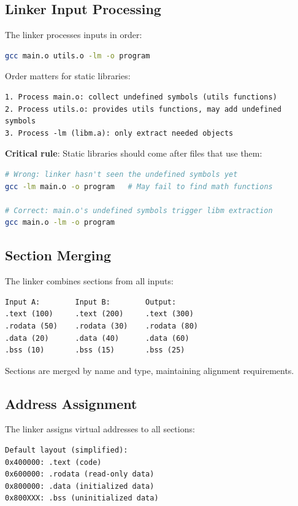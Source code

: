 \subsection{Linker Input Processing}

The linker processes inputs in order:

\begin{lstlisting}[language=bash]
gcc main.o utils.o -lm -o program
\end{lstlisting}

Order matters for static libraries:
\begin{verbatim}
1. Process main.o: collect undefined symbols (utils functions)
2. Process utils.o: provides utils functions, may add undefined symbols
3. Process -lm (libm.a): only extract needed objects
\end{verbatim}

\textbf{Critical rule}: Static libraries should come after files that use them:
\begin{lstlisting}[language=bash]
# Wrong: linker hasn't seen the undefined symbols yet
gcc -lm main.o -o program   # May fail to find math functions

# Correct: main.o's undefined symbols trigger libm extraction
gcc main.o -lm -o program
\end{lstlisting}

\subsection{Section Merging}

The linker combines sections from all inputs:

\begin{verbatim}
Input A:        Input B:        Output:
.text (100)     .text (200)     .text (300)
.rodata (50)    .rodata (30)    .rodata (80)
.data (20)      .data (40)      .data (60)
.bss (10)       .bss (15)       .bss (25)
\end{verbatim}

Sections are merged by name and type, maintaining alignment requirements.

\subsection{Address Assignment}

The linker assigns virtual addresses to all sections:

\begin{verbatim}
Default layout (simplified):
0x400000: .text (code)
0x600000: .rodata (read-only data)
0x800000: .data (initialized data)
0x800XXX: .bss (uninitialized data)
\end{verbatim}

